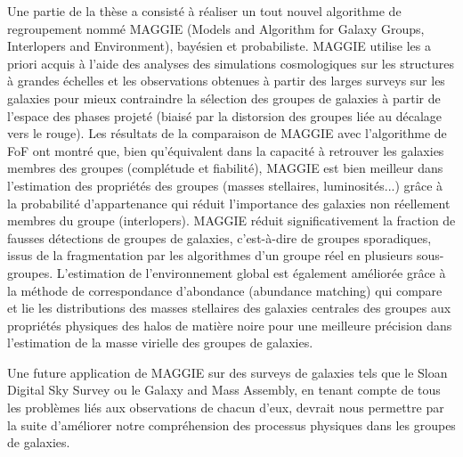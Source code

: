 Une partie de la thèse a consisté à réaliser un tout nouvel algorithme de
regroupement nommé MAGGIE (Models and Algorithm for Galaxy Groups, Interlopers
and Environment), bayésien et probabiliste. MAGGIE utilise les a priori acquis
à l'aide des analyses des simulations cosmologiques sur les structures à
grandes échelles et les observations obtenues à partir des larges surveys sur
les galaxies pour mieux contraindre la sélection des groupes de galaxies à
partir de l'espace des phases projeté (biaisé par la distorsion des groupes
liée au décalage vers le rouge). Les résultats de la comparaison de MAGGIE avec
l'algorithme de FoF ont montré que, bien qu'équivalent dans la capacité à
retrouver les galaxies membres des groupes (complétude et fiabilité), MAGGIE
est bien meilleur dans l'estimation des propriétés des groupes (masses
stellaires, luminosités...) grâce à la probabilité d'appartenance qui réduit
l'importance des galaxies non réellement membres du groupe (interlopers).
MAGGIE réduit significativement la fraction de fausses détections de groupes de
galaxies, c'est-à-dire de groupes sporadiques, issus de la fragmentation par
les algorithmes d'un groupe réel en plusieurs sous-groupes. L'estimation de
l'environnement global est également améliorée grâce à la méthode de
correspondance d'abondance (abundance matching) qui compare et lie les
distributions des masses stellaires des galaxies centrales des groupes aux
propriétés physiques des halos de matière noire pour une meilleure précision
dans l'estimation de la masse virielle des groupes de galaxies.

Une future application de MAGGIE sur des surveys de galaxies tels que le Sloan
Digital Sky Survey ou le Galaxy and Mass Assembly, en tenant compte de tous les
problèmes liés aux observations de chacun d'eux, devrait nous permettre par la
suite d'améliorer notre compréhension des processus physiques dans les groupes
de galaxies.

